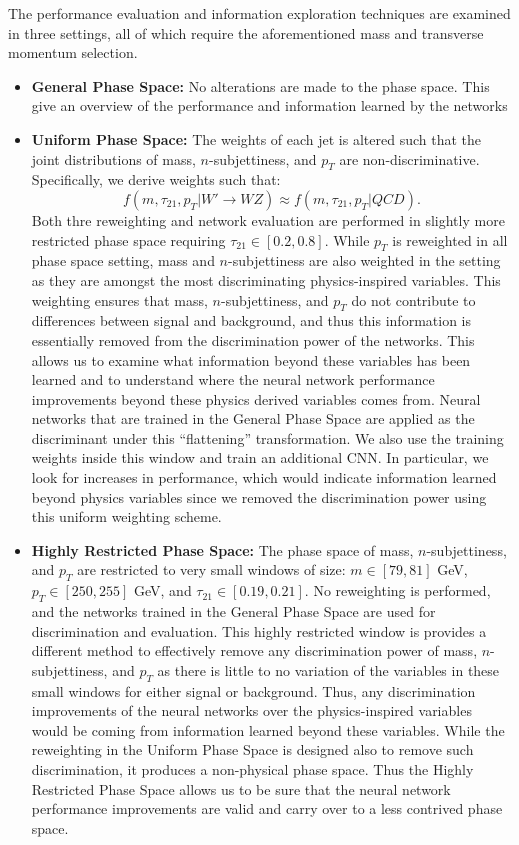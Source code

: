 The performance evaluation and information exploration techniques are examined in three settings, all of which require the aforementioned mass and transverse momentum selection.
\begin{itemize}

\item \textbf{General Phase Space:} No alterations are made to the phase space.  This give an overview of the performance and information learned by the networks

\item  \textbf{Uniform Phase Space:}  The weights of each jet is altered such that the joint distributions of mass, $n$-subjettiness, and $p_T$ are non-discriminative.  Specifically, we derive weights such that:
\begin{equation}
  f(m, \tau_{21}, p_T| W'\rightarrow WZ) \approx f(m, \tau_{21}, p_T| QCD).
\end{equation}
Both thre reweighting and network evaluation are performed in slightly more restricted phase space requiring $\tau_{21}\in [0.2, 0.8]$. While $p_T$ is reweighted in all phase space setting, mass and $n$-subjettiness are also weighted in the setting as they are amongst the most discriminating physics-inspired variables.  This weighting ensures that mass, $n$-subjettiness, and $p_T$ do not contribute to differences between signal and background, and thus this information is essentially removed from the discrimination power of the networks.  This allows us to examine what information beyond these variables has been learned and to understand where the neural network performance improvements beyond these physics derived variables comes from.  Neural networks that are trained in the General Phase Space are applied as the discriminant under this ``flattening'' transformation. We also use the training weights inside this window and train an additional CNN. In particular, we look for increases in performance, which would indicate information learned beyond physics variables since we removed the discrimination power using this uniform weighting scheme.

\item \textbf{Highly Restricted Phase Space:} The phase space of mass, $n$-subjettiness, and $p_T$ are restricted to very small windows of size: $m\in [79, 81]$ GeV,  $p_T \in [250, 255]$ GeV, and  $\tau_21 \in [0.19, 0.21]$. No reweighting is performed, and the networks trained in the General Phase Space are used for discrimination and evaluation.  This highly restricted window is provides a different method to effectively remove any discrimination power of mass, $n$-subjettiness, and $p_T$ as there is little to no variation of the variables in these small windows for either signal or background.  Thus, any discrimination improvements of the neural networks over the physics-inspired variables would be coming from information learned beyond these variables.  While the reweighting in the Uniform  Phase Space is designed also to remove such discrimination, it produces a non-physical phase space.  Thus the Highly Restricted Phase Space allows us to be sure that the neural network performance improvements are valid and carry over to a less contrived phase space.

\end{itemize}
